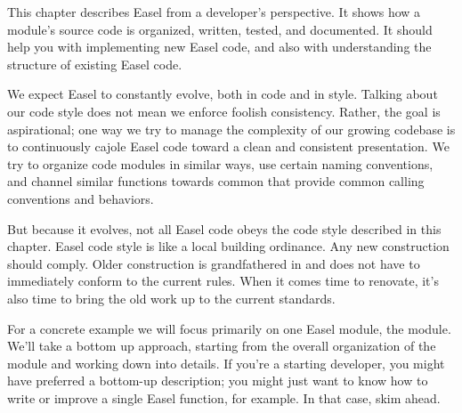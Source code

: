 
This chapter describes Easel from a developer's perspective. It shows
how a module's source code is organized, written, tested, and
documented. It should help you with implementing new Easel code, and
also with understanding the structure of existing Easel code.

We expect Easel to constantly evolve, both in code and in style.
Talking about our code style does not mean we enforce foolish
consistency. Rather, the goal is aspirational; one way we try to
manage the complexity of our growing codebase is to continuously
cajole Easel code toward a clean and consistent presentation. We try
to organize code modules in similar ways, use certain naming
conventions, and channel similar functions towards common
 that provide common calling conventions and
behaviors.

But because it evolves, not all Easel code obeys the code style
described in this chapter. Easel code style is like a local building
ordinance. Any new construction should comply. Older construction is
grandfathered in and does not have to immediately conform to the
current rules. When it comes time to renovate, it's also time to bring
the old work up to the current standards.

For a concrete example we will focus primarily on one Easel module,
the  module. We'll take a bottom up approach, starting
from the overall organization of the module and working down into
details. If you're a starting developer, you might have preferred a
bottom-up description; you might just want to know how to write or
improve a single Easel function, for example. In that case, skim
ahead.

